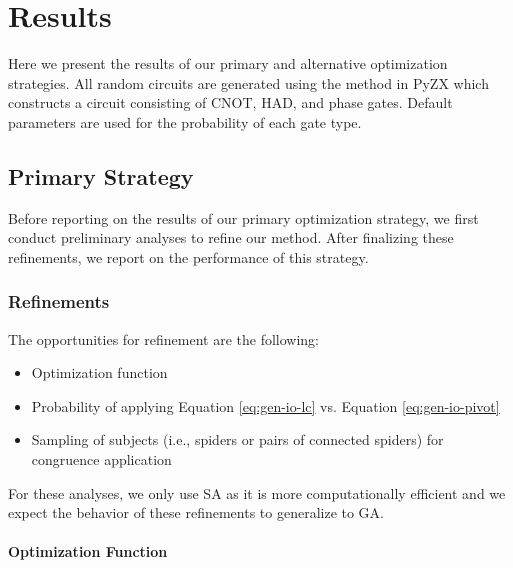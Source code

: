 \chapter[Results]{Results} \label{ch:results}

Here we present the results of our primary and alternative optimization strategies.
All random circuits are generated using the  method in PyZX which constructs a circuit consisting of CNOT, HAD, and phase gates.
Default parameters are used for the probability of each gate type.

\section{Primary Strategy}

Before reporting on the results of our primary optimization strategy, we first conduct preliminary analyses to refine our method.
After finalizing these refinements, we report on the performance of this strategy.

\subsection{Refinements}

The opportunities for refinement are the following:
\begin{itemize}
\item
  Optimization function
\item
  Probability of applying Equation \ref{eq:gen-io-lc} vs. Equation \ref{eq:gen-io-pivot}
\item
  Sampling of subjects (i.e., spiders or pairs of connected spiders) for congruence application
\end{itemize}
For these analyses, we only use SA as it is more computationally efficient and we expect the behavior of these refinements to generalize to GA.

\subsubsection*{Optimization Function}

